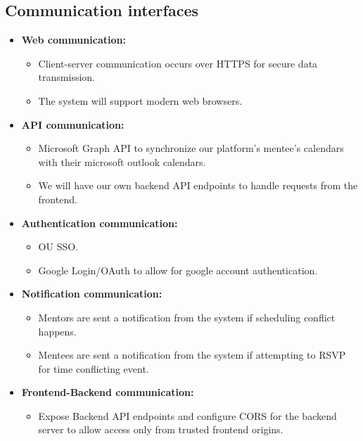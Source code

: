 \subsection{Communication interfaces}

\begin{itemize}
    \item \textbf{Web communication:}
    \begin{itemize}
        \item Client-server communication occurs over HTTPS for secure data
        transmission.

        \item The system will support modern web browsers.
    \end{itemize}

    \item \textbf{API communication:}
    \begin{itemize}
        \item Microsoft Graph API to synchronize our platform's mentee's
        calendars with their microsoft outlook calendars.

        \item We will have our own backend API endpoints to handle requests from
        the frontend.
    \end{itemize}

    \item \textbf{Authentication communication:}
    \begin{itemize}
        \item OU SSO.
        
        \item Google Login/OAuth to allow for google account authentication.
    \end{itemize}

    \item \textbf{Notification communication:}
    \begin{itemize}
        \item Mentors are sent a notification from the system if scheduling
        conflict happens.

        \item Mentees are sent a notification from the system if attempting to
        RSVP for time conflicting event.
    \end{itemize}

    \item \textbf{Frontend-Backend communication:}
    \begin{itemize}
        \item Expose Backend API endpoints and configure CORS for the backend
        server to allow access only from trusted frontend origins.
    \end{itemize}
\end{itemize}
